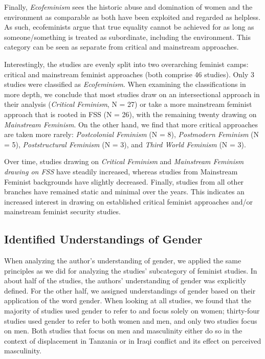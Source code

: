 \documentclass[10pt,a4paper]{article}
\begin{document}
\begin{multicols}{2}
Finally, \textit{Ecofeminism} sees the historic abuse and domination of women and the environment as comparable as both have been exploited and regarded as helpless. As such, ecofeminists argue that true equality cannot be achieved for as long as someone/something is treated as subordinate, including the environment. This category can be seen as separate from critical and mainstream approaches.

Interestingly, the studies are evenly split into two overarching feminist camps: critical and mainstream feminist approaches (both comprise 46 studies). Only 3 studies were classified as \textit{Ecofeminism}. When examining the classifications in more depth, we conclude that most studies draw on an intersectional approach in their analysis (\textit{Critical Feminism}, N = 27) or take a more mainstream feminist approach that is rooted in FSS (N = 26), with the remaining twenty drawing on \textit{Mainstream Feminism}. On the other hand, we find that more critical approaches are taken more rarely: \textit{Postcolonial Feminism} (N = 8), \textit{Postmodern Feminism} (N = 5), \textit{Poststructural Feminism} (N = 3), and \textit{Third World Feminism} (N = 3).

Over time, studies drawing on \textit{Critical Feminism} and \textit{Mainstream Feminism drawing on FSS} have steadily increased, whereas studies from Mainstream Feminist backgrounds have slightly decreased. Finally, studies from all other branches have remained static and minimal over the years. This indicates an increased interest in drawing on established critical feminist approaches and/or mainstream feminist security studies.

\subsection{Identified Understandings of Gender}

\noindent When analyzing the author's understanding of gender, we applied the same principles as we did for analyzing the studies' subcategory of feminist studies. In about half of the studies, the authors' understanding of gender was explicitly defined. For the other half, we assigned understandings of gender based on their application of the word gender. When looking at all studies, we found that the majority of studies used gender to refer to and focus solely on women; thirty-four studies used gender to refer to both women and men, and only two studies focus on men. Both studies that focus on men and masculinity either do so in the context of displacement in Tanzania \citep{R29} or in Iraqi conflict \citep{R17} and its effect on perceived masculinity.


\end{multicols}
\end{document}
